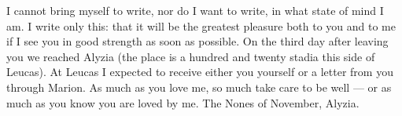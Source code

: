 

 I cannot bring myself to write, nor do I want to write, in what state of mind I am. I write only this: that it will be the greatest pleasure both to you and to me if I see you in good strength as soon as possible. On the third day after leaving you we reached Alyzia (the place is a hundred and twenty stadia this side of Leucas). At Leucas I expected to receive either you yourself or a letter from you through Marion. As much as you love me, so much take care to be well --- or as much as you know you are loved by me. The Nones of November, Alyzia.
